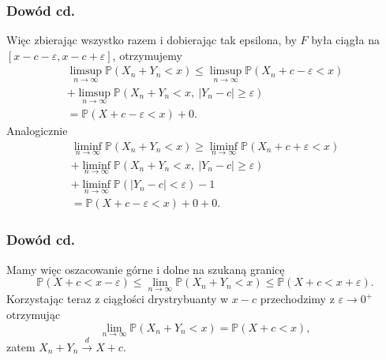 \documentclass{beamer}
\begin{document}
	\begin{frame}
		\frametitle{Dowód cd.}
		Więc zbierając wszystko razem i dobierając tak epsilona, by $F$ była ciągła na $\left[x-c-\varepsilon, x-c+\varepsilon\right]$, otrzymujemy
		\begin{equation}
			\begin{split}
				\limsup\limits_{n\to\infty}\mathbb{P}\left(X_n+Y_n<x\right)\leq\limsup\limits_{n\to\infty}\mathbb{P}\left(X_n+c-\varepsilon<x\right)\\+
				\limsup\limits_{n\to\infty}\mathbb{P}\left(X_n+Y_n<x,\ |Y_n-c|\geq\varepsilon\right)\\=
				\mathbb{P}\left(X+c-\varepsilon<x\right)+0.
			\end{split}
		\end{equation}\pause
		Analogicznie
		\begin{equation}
			\begin{split}
				\liminf\limits_{n\to\infty}\mathbb{P}\left(X_n+Y_n<x\right)\geq\liminf\limits_{n\to\infty}\mathbb{P}\left(X_n+c+\varepsilon<x\right)\\+
				\liminf\limits_{n\to\infty}\mathbb{P}\left(X_n+Y_n<x,\ |Y_n-c|\geq\varepsilon\right)\\+
				\liminf\limits_{n\to\infty}\mathbb{P}\left(|Y_n-c|<\varepsilon\right)-1\\=
				\mathbb{P}\left(X+c-\varepsilon<x\right)+0+0.
			\end{split}
		\end{equation}
	\end{frame}

	\begin{frame}
		\frametitle{Dowód cd.}
		Mamy więc oszacowanie górne i dolne na szukaną granicę
		\begin{equation}
			\mathbb{P}\left(X+c<x-\varepsilon\right)\leq \lim\limits_{n\to\infty}\mathbb{P}\left(X_n+Y_n<x\right) \leq \mathbb{P}\left(X+c<x+\varepsilon\right).
		\end{equation}\pause
		Korzystając teraz z ciągłości drystrybuanty w $x-c$ przechodzimy z $\varepsilon\to0^+$ otrzymując
		\begin{equation}
			 \lim\limits_{n\to\infty}\mathbb{P}\left(X_n+Y_n<x\right)=\mathbb{P}\left(X+c<x\right),
		\end{equation}
		zatem $X_n+Y_n\xrightarrow{d}X+c$.
	\end{frame}
\end{document}
